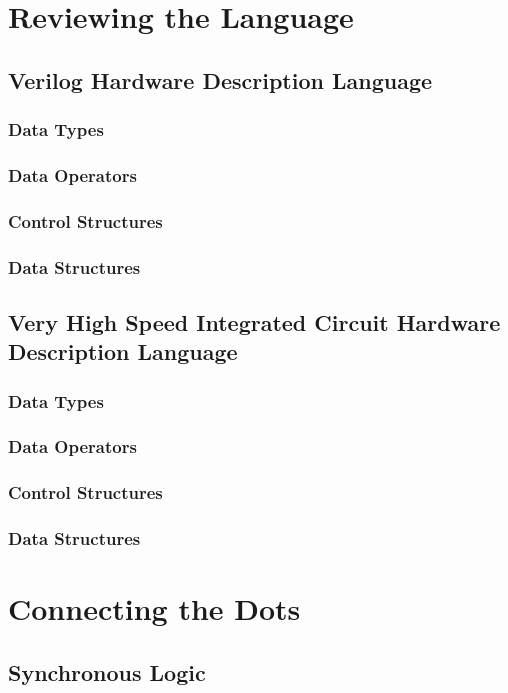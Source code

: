 \documentclass[a4paper,11pt]{book}
\begin{document}
\part{Reviewing the Language}
\chapter[Verilog]{Verilog Hardware Description Language}
\section{Data Types}
\section{Data Operators}
\section{Control Structures}
\section{Data Structures}

\chapter[VHDL]{Very High Speed Integrated Circuit Hardware Description Language}
\section{Data Types}
\section{Data Operators}
\section{Control Structures}
\section{Data Structures}

\part{Connecting the Dots}



\chapter{Synchronous Logic}
\end{document}

